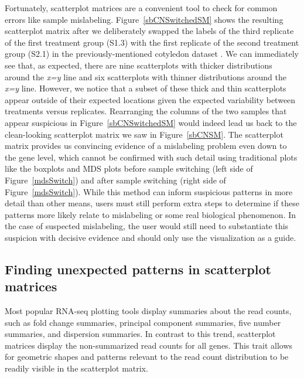 \documentclass{bmcart}
\begin{document}
\begin{linenumbers}
\begin{doublespacing}
Fortunately, scatterplot matrices are a convenient tool to check for common errors like sample mislabeling. Figure~\ref{sbCNSwitchedSM} shows the resulting scatterplot matrix after we deliberately swapped the labels of the third replicate of the first treatment group (S1.3) with the first replicate of the second treatment group (S2.1) in the previously-mentioned cotyledon dataset \cite{Brown}. We can immediately see that, as expected, there are nine scatterplots with thicker distributions around the \textit{x=y} line and six scatterplots with thinner distributions around the \textit{x=y} line. However, we notice that a subset of these thick and thin scatterplots appear outside of their expected locations given the expected variability between treatments versus replicates. Rearranging the columns of the two samples that appear suspicious in Figure~\ref{sbCNSwitchedSM} would indeed lead us back to the clean-looking scatterplot matrix we saw in Figure~\ref{sbCNSM}. The scatterplot matrix provides us convincing evidence of a mislabeling problem even down to the gene level, which cannot be confirmed with such detail using traditional plots like the boxplots and MDS plots before sample switching (left side of Figure~\ref{mdsSwitch}) and after sample switching (right side of Figure~\ref{mdsSwitch}). While this method can inform suspicious patterns in more detail than other means, users must still perform extra steps to determine if these patterns more likely relate to mislabeling or some real biological phenomenon. In the case of suspected mislabeling, the user would still need to substantiate this suspicion with decisive evidence and should only use the visualization as a guide.

\subsection*{Finding unexpected patterns in scatterplot matrices}

Most popular RNA-seq plotting tools display summaries about the read counts, such as fold change summaries, principal component summaries, five number summaries, and dispersion summaries. In contrast to this trend, scatterplot matrices display the non-summarized read counts for all genes. This trait allows for geometric shapes and patterns relevant to the read count distribution to be readily visible in the scatterplot matrix.


\end{doublespacing}
\end{linenumbers}
\end{document}
